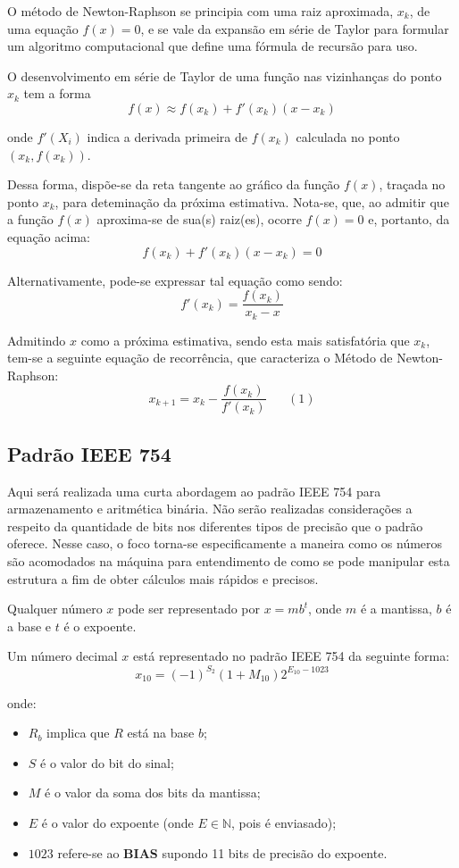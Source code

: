 	O método de Newton-Raphson se principia com uma raiz aproximada, $x_k$, de uma equação
	$f(x) = 0$, e se vale da expansão em série de Taylor para formular um algoritmo computacional que define uma fórmula
	de recursão para uso.

	O desenvolvimento em série de Taylor de uma função nas vizinhanças do ponto $x_k$ tem a forma
	$$f(x) \approx f(x_k) + f'(x_k)(x - x_k)$$

	onde $f'(X_i)$ indica a derivada primeira de $f(x_k)$ calculada no ponto $(x_k, f(x_k))$.

	Dessa forma, dispõe-se da reta tangente ao gráfico da função $f(x)$, traçada no ponto $x_k$, para deteminação da próxima
	estimativa. Nota-se, que, ao admitir que a função $f(x)$ aproxima-se de sua(s) raiz(es), ocorre $f(x) = 0$ e, portanto, da equação acima:
	$$f(x_k) + f'(x_k) (x-x_k) = 0$$

	Alternativamente, pode-se expressar tal equação como sendo:
	$$f'(x_k) = \frac{f(x_k)}{x_k - x}$$

	Admitindo $x$ como a próxima estimativa, sendo esta mais satisfatória que $x_k$, tem-se a seguinte equação de recorrência, que caracteriza o Método de Newton-Raphson:
	$$x_{k+1} = x_k - \frac{f(x_k)}{f'(x_k)}\;\;\;\;\;\;(1)$$

	\subsection{Padrão IEEE 754}

	Aqui será realizada uma curta abordagem ao padrão IEEE 754 para armazenamento e aritmética binária. Não serão realizadas considerações
	a respeito da quantidade de bits nos diferentes tipos de precisão que o padrão oferece. Nesse caso, o foco torna-se especificamente a
	maneira como os números são acomodados na máquina para entendimento de como se pode manipular esta estrutura a fim de obter cálculos mais rápidos e precisos.

	Qualquer número $x$ pode ser representado por $x = mb^t$, onde $m$ é a mantissa, $b$ é a base e $t$ é o expoente.

	Um número decimal $x$ está representado no padrão IEEE 754 da seguinte forma:
	$$x_{10} = (-1)^{S_2}(1 + M_{10})2^{E_{10} - 1023}$$

	onde:
	\begin{itemize}
		\item $R_b$ implica que $R$ está na base $b$;
		\item $S$ é o valor do bit do sinal;
		\item $M$ é o valor da soma dos bits da mantissa;
		\item $E$ é o valor do expoente (onde $E\in\mathbb{N}$, pois é enviasado);
		\item $1023$ refere-se ao \textbf{BIAS} supondo 11 bits de precisão do expoente.
 	\end{itemize}

